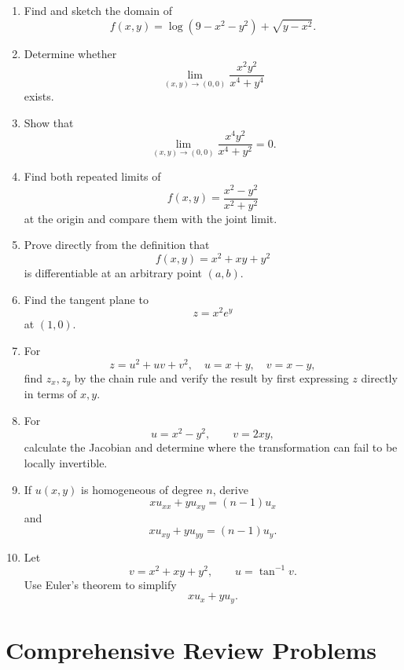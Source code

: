 \documentclass[11pt,oneside]{book}
\theoremstyle{studentthm}
\theoremstyle{definition}
\begin{document}
\begin{enumerate}
\item Find and sketch the domain of
\[
f(x,y)=\log(9-x^2-y^2)+\sqrt{y-x^2}.
\]

\item Determine whether
\[
\lim_{(x,y)\to(0,0)}
\frac{x^2y^2}{x^4+y^4}
\]
exists.

\item Show that
\[
\lim_{(x,y)\to(0,0)}
\frac{x^4y^2}{x^4+y^2}=0.
\]

\item Find both repeated limits of
\[
f(x,y)=\frac{x^2-y^2}{x^2+y^2}
\]
at the origin and compare them with the joint limit.

\item Prove directly from the definition that
\[
f(x,y)=x^2+xy+y^2
\]
is differentiable at an arbitrary point \((a,b)\).

\item Find the tangent plane to
\[
z=x^2e^y
\]
at \((1,0)\).

\item For
\[
z=u^2+uv+v^2,\quad
u=x+y,\quad
v=x-y,
\]
find \(z_x,z_y\) by the chain rule and verify the result by first
expressing \(z\) directly in terms of \(x,y\).

\item For
\[
u=x^2-y^2,\qquad v=2xy,
\]
calculate the Jacobian and determine where the transformation can fail
to be locally invertible.

\item If \(u(x,y)\) is homogeneous of degree \(n\), derive
\[
xu_{xx}+yu_{xy}=(n-1)u_x
\]
and
\[
xu_{xy}+yu_{yy}=(n-1)u_y.
\]

\item Let
\[
v=x^2+xy+y^2,\qquad
u=\tan^{-1}v.
\]
Use Euler's theorem to simplify
\[
xu_x+yu_y.
\]
\end{enumerate}


\section{Comprehensive Review Problems}
\end{document}
